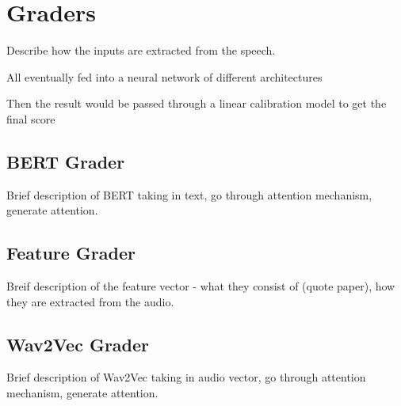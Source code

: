 \chapter{Graders} \label{chap:graders}

Describe how the inputs are extracted from the speech.

All eventually fed into a neural network of different architectures

Then the result would be passed through a linear calibration model to get the final score

\section{BERT Grader}

Brief description of BERT taking in text, go through attention mechanism, generate attention.

\section{Feature Grader}

Breif description of the feature vector - what they consist of (quote paper), how they are extracted from the audio.

\section{Wav2Vec Grader}

Brief description of Wav2Vec taking in audio vector, go through attention mechanism, generate attention.